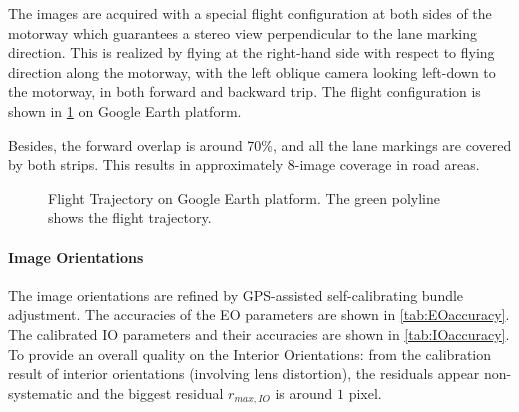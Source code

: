\clearpage

The images are acquired with a special flight configuration at both sides of the motorway which guarantees a stereo view perpendicular to the lane marking direction. This is realized by flying at the right-hand side with respect to flying direction along the motorway, with the left oblique camera looking left-down to the motorway, in both forward and backward trip. The flight configuration is shown in \cref{fig:FlightTrajectory} on Google Earth platform.

Besides, the forward overlap is around 70\%, and all the lane markings are covered by both strips. This results in approximately 8-image coverage in road areas.

\begin{figure}%
  \centering
  \caption{Flight Trajectory on Google Earth platform. The green polyline shows the flight trajectory.}
  \label{fig:FlightTrajectory}
\end{figure}


\paragraph{Image Orientations}
The image orientations are refined by GPS-assisted self-calibrating bundle adjustment. The accuracies of the EO parameters are shown in \cref{tab:EOaccuracy}. The calibrated IO parameters and their accuracies are shown in \cref{tab:IOaccuracy}. To provide an overall quality on the Interior Orientations: from the calibration result of interior orientations (involving lens distortion), the residuals appear non-systematic and the biggest residual $r_{max, IO}$ is around $1$ pixel.
\clearpage %

